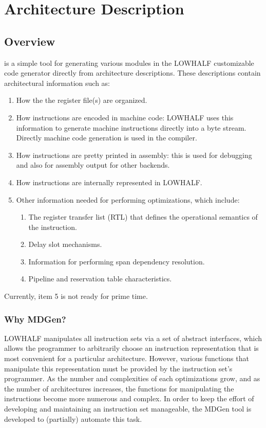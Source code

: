 \section{Architecture Description}
\subsection{Overview}

   is a simple tool for generating 
various modules in the LOWHALF customizable code generator
directly from architecture descriptions.   These descriptions 
contain architectural information such as:
\begin{enumerate}
    \item How the the register file(s) are organized.   
    \item How instructions are encoded in machine code: LOWHALF uses
this information to generate machine instructions directly into a byte stream.
Directly machine code generation is used in the compiler.
    \item How instructions are pretty printed in assembly: this is used
for debugging and also for assembly output for other backends.
    \item How instructions are internally represented in LOWHALF. 
   \item Other information needed for performing optimizations, which
        include:
   \begin{enumerate}
     \item The register transfer list (RTL) that defines the 
           operational semantics of the instruction.
     \item Delay slot mechanisms.
     \item Information for performing span dependency resolution.
     \item Pipeline and reservation table characteristics.
   \end{enumerate}
\end{enumerate}

Currently, item 5 is not ready for prime time.

\subsubsection{Why MDGen?}
LOWHALF manipulates all instruction sets via a set of abstract
interfaces, which allows the programmer to arbitrarily choose an
instruction representation that is most convenient for a particular 
architecture.  However, various functions that manipulate
this representation must be provided by the instruction set's programmer.  
As the number and complexities of each optimizations grow, and as
the number of architectures increases, the functions
for manipulating the instructions become more numerous and complex.
In order to keep the effort of developing and maintaining
an instruction set manageable,
the MDGen tool is developed to (partially) automate this task.
 
